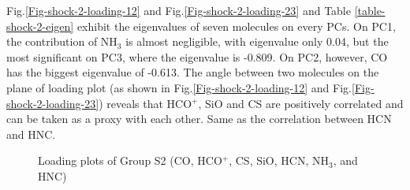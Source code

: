 \documentclass{aa}
\begin{document}
\begin{CJK*}{UTF8}{gbsn}
    Fig.\ref{Fig-shock-2-loading-12} and Fig.\ref{Fig-shock-2-loading-23} and Table \ref{table-shock-2-eigen} exhibit the eigenvalues of seven molecules on every PCs. 
    On PC1, the contribution of NH$_3$ is almost negligible, with eigenvalue only 0.04, but the most significant on PC3, where the eigenvalue is -0.809. 
    On PC2, however, CO has the biggest eigenvalue of -0.613. The angle between two molecules on the plane of loading plot (as shown in Fig.\ref{Fig-shock-2-loading-12} and Fig.\ref{Fig-shock-2-loading-23}) reveals that HCO$^+$, SiO and CS are positively correlated and can be taken as a proxy with each other. 
    Same as the correlation between HCN and HNC.


 
\begin{figure}[htp]
\centering  
{}
\caption{Loading plots of Group S2 (CO, HCO$^+$, CS, SiO, HCN, NH$_3$, and HNC)}
\label{Fig-shock-2-loading}
\end{figure}



\end{CJK*}
\end{document}
